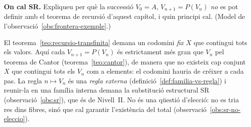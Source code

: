 \begin{exercici}
\textbf{On cal SR.} Expliqueu per què la successió \(V_0=A\), \(V_{n+1}=P(V_n)\) \emph{no} es pot definir amb el teorema de recursió d'aquest capítol, i quin principi cal. (Model de l'observació~\ref{obs:frontera-exemple}.)
\end{exercici}
\begin{solucio}
El teorema~\ref{teo:recursio-transfinita} demana un codomini \emph{fix} \(X\) que contingui tots els valors. Aquí cada \(V_{n+1}=P(V_n)\) és estrictament més gran que \(V_n\) pel teorema de Cantor (teorema~\ref{teo:cantor}), de manera que no existeix cap conjunt \(X\) que contingui tots els \(V_n\) com a elements: el codomini hauria de créixer a cada pas. La regla \(n\mapsto V_n\) és una \emph{regla externa} (definició~\ref{def:familia-vs-regla}) i reunir-la en una família interna demana la substitució estructural SR (observació~\ref{obs:sr}), que és de Nivell~II. No és una qüestió d'elecció: no es tria res dins fibres, sinó que cal garantir l'existència del total (observació~\ref{obs:sr-no-eleccio}).
\end{solucio}

